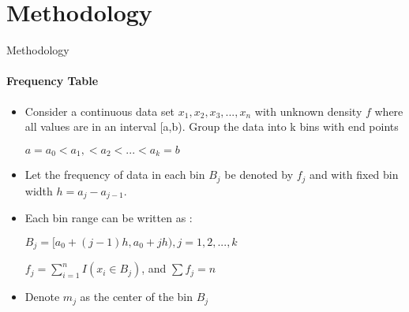 \documentclass{beamer}
\begin{document}
\section{Methodology}
\begin{frame}{Methodology}
\framesubtitle{Frequency Table}
\begin{itemize}

\item Consider a continuous data set $x_{1}, x_{2},x_{3},...,x_{n}$ with unknown density $f$ where all values are in an interval [a,b). Group the data into k bins with end points

 {\center $ a = a_0 < a_1, < a_2 < ... < a_k = b$ \\} \;

\item Let the frequency of data in each bin $B_j$ be denoted by $f_j$ and with fixed bin width $h = a_j - a_{j-1}$.

\item  Each bin range can be written as :

	{\center $B_j = [a_0 + (j-1)h , a_0 + jh) , j= 1,2,...,k$ \\} 
	
	{\center $f_j = \sum\limits_{i=1}^{n} I ( x_i \in B_j)$, and $\sum f_j = n$\\}
	
\item Denote $m_j$ as the center of the bin $B_j$

\end{itemize}

\end{frame}
\end{document}

